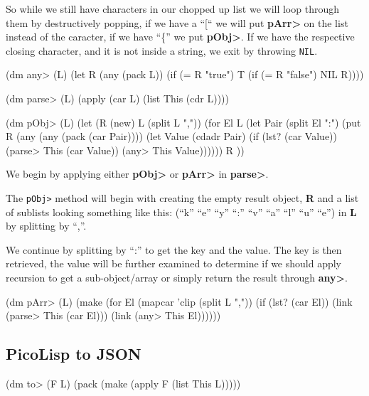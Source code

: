 So while we still have characters in our chopped up list we will loop
through them by destructively popping, if we have a ``[`` we will put
\textbf{pArr\textgreater{}} on the list instead of the caracter, if we
have ``\{'' we put \textbf{pObj\textgreater{}}. If we have the
respective closing character, and it is not inside a string, we exit
by throwing \texttt{NIL}.


\begin{wideverbatim}
(dm any> (L)
   (let R (any (pack L))      
      (if (= R "true") T (if (= R "false") NIL R))))

(dm parse> (L)  
  (apply (car L) (list This (cdr L))))
    
(dm pObj> (L)
  (let (R (new) L (split L ",")) 
     (for El L
        (let Pair (split El ":")
           (put R 
              (any (any (pack (car Pair)))) 
              (let Value (cdadr Pair)                 
                 (if (lst? (car Value))
                    (parse> This (car Value))
                    (any> This Value)))))) R ))
\end{wideverbatim}

We begin by applying either \textbf{pObj\textgreater{}} or
\textbf{pArr\textgreater{}} in \textbf{parse\textgreater{}}.

The \texttt{pObj>} method will begin with creating the empty result
object, \textbf{R} and a list of sublists looking something like this:
(``k'' ``e'' ``y'' ``:'' ``v'' ``a'' ``l'' ``u'' ``e'') in \textbf{L} by
splitting by ``,''.

We continue by splitting by ``:'' to get the key and the value. The key is
then retrieved, the value will be further examined to determine if we
should apply recursion to get a sub-object/array or simply return the
result through \textbf{any\textgreater{}}.

\begin{wideverbatim}
(dm pArr> (L)
   (make       
      (for El (mapcar 'clip (split L ","))         
         (if (lst? (car El))
            (link (parse> This (car El)))
            (link (any> This El))))))
\end{wideverbatim}


\subsection{PicoLisp to JSON}
\label{sec:pl-json-picolisp-to-json}


\begin{wideverbatim}
(dm to> (F L)
   (pack (make (apply F (list This L)))))
\end{wideverbatim}

